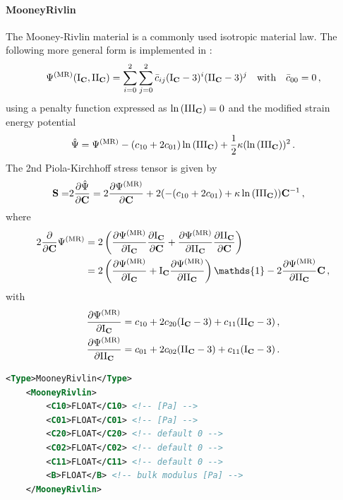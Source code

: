 \paragraph{MooneyRivlin}
The Mooney-Rivlin material is a commonly used isotropic material law.
The following more general form is implemented in \CM:
\begin{equation}
    \Psi^{(\mathrm{MR})} (\I{C},\II{C}) = 
    \sum_{i=0}^2 \sum_{j=0}^2 \Bar{c}_{ij} (\I{C} - 3)^i (\II{C} - 3)^j \qq{with} \Bar{c}_{00} = 0 \,,
\end{equation}
using a penalty function expressed as $\ln{(\III{C})} = 0$ and the modified strain energy potential
\begin{equation}
    \hat{\Psi} = \Psi^{(\mathrm{MR})} -(c_{10} + 2 c_{01}) \ln{(\III{C})} + \frac{1}{2}\kappa (\ln{(\III{C})})^2 \,.
\end{equation}
The 2nd Piola-Kirchhoff stress tensor is given by
\begin{align}
    \vec S =&
    2 \pdv{\hat{\Psi}}{\C} = 
    2 \pdv{\Psi^{(\mathrm{MR})}}{\C} + 2(-(c_{10} + 2 c_{01}) + \kappa \ln{(\III{C})})\C^{-1} \,,
\end{align}
where
\begin{align}
    2 \pdv{}{\C}\Psi^{(\mathrm{MR})} &= 
    2 \left( \pdv{\Psi^{(\mathrm{MR})}}{\I{C}} \pdv{\I{C}}{\C} + \pdv{\Psi^{(\mathrm{MR})}}{\II{C}} \pdv{\II{C}}{\C} \right)  \\
    &= 2 \left( \pdv{\Psi^{(\mathrm{MR})}}{\I{C}} + \I{\C}\pdv{\Psi^{(\mathrm{MR})}}{\II{C}} \right) \mathds{1} - 2 \pdv{\Psi^{(\mathrm{MR})}}{\II{C}} \C \,,
\end{align}
with
\begin{align}
    \pdv{\Psi^{(\mathrm{MR})}}{\I{C}} &= c_{10} + 2 c_{20} (\I{C} - 3) + c_{11} (\II{C} - 3) \,,\\
    \pdv{\Psi^{(\mathrm{MR})}}{\II{C}} &= c_{01} + 2 c_{02} (\II{C} - 3) + c_{11} (\I{C} - 3)\,.
\end{align}

\begin{lstlisting}[language=XML,caption=.xml settings for general Rivlin material]
    <Type>MooneyRivlin</Type>
    <MooneyRivlin>
        <C10>FLOAT</C10> <!-- [Pa] -->
        <C01>FLOAT</C01> <!-- [Pa] -->
        <C20>FLOAT</C20> <!-- default 0 -->
        <C02>FLOAT</C02> <!-- default 0 -->
        <C11>FLOAT</C11> <!-- default 0 -->
        <B>FLOAT</B> <!-- bulk modulus [Pa] -->
    </MooneyRivlin>
\end{lstlisting}

